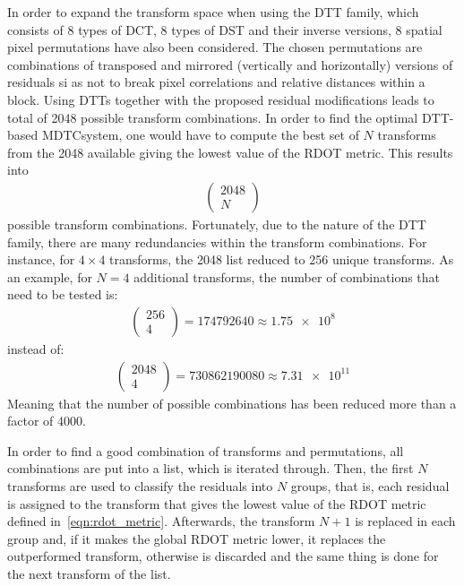 \documentclass[11pt,a4paper,openright,twoside]{book}
\numberwithin{equation}{section} %
\numberwithin{figure}{section} %
\numberwithin{table}{section} %
\begin{document}
In order to expand the transform space when using the \ac{DTT} family, which
consists of 8 types of \ac{DCT}, 8 types of \ac{DST} and their inverse
versions, 8 spatial pixel permutations have also been considered.
The chosen permutations are combinations of transposed and mirrored
(vertically and horizontally) versions of residuals si as not to break pixel
correlations and relative distances within a block.
Using \acp{DTT} together with the proposed residual modifications leads to
total of 2048 possible transform combinations.
In order to find the optimal \acs{DTT}-based \ac{MDTC}system, one would have
to compute the best set of $N$ transforms from the 2048 available giving the
lowest value of the \ac{RDOT} metric.
This results into
\begin{align}
	\left(
	\begin{matrix}
		2048 \\
		N
	\end{matrix}
	\right)
\end{align}
possible transform combinations.
Fortunately, due to the nature of the \ac{DTT} family, there are many
redundancies within the transform combinations.
For instance, for $4\times4$ transforms, the 2048 list reduced to 256
unique transforms.
As an example, for $N=4$ additional transforms, the number of combinations
that need to be tested is:
\begin{align}
	\left(
	\begin{matrix}
		256 \\
		4
	\end{matrix}
	\right) =
	\num{174792640}\approx\num{1.75e8}
\end{align}
instead of:
\begin{align}
	\left(
	\begin{matrix}
		2048 \\
		4
	\end{matrix}
	\right) =
	\num{730862190080}\approx\num{7.31e11}
\end{align}
Meaning that the number of possible combinations has been reduced more than a
factor of 4000.

In order to find a good combination of transforms and permutations, all
combinations are put into a list, which is iterated through.
Then, the first $N$ transforms are used to classify the residuals into $N$
groups, that is, each residual is assigned to the transform that gives the
lowest value of the \ac{RDOT} metric defined in~\eqref{eqn:rdot_metric}.
Afterwards, the transform $N+1$ is replaced in each group and, if it makes the
global \acs{RDOT} metric lower, it replaces the outperformed transform,
otherwise is discarded and the same thing is done for the next transform of
the list.
\end{document}
